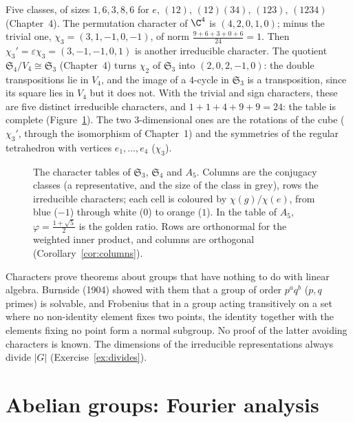 \begin{example}[$\mathfrak S_4$]\label{ex:s4}
Five classes, of sizes $1,6,3,8,6$ for $e$, $(12)$, $(12)(34)$, $(123)$, $(1234)$ (Chapter~4). The permutation character of $\C^4$ is $(4,2,0,1,0)$; minus the trivial one, $\chi_3=(3,1,-1,0,-1)$, of norm $\frac{9+6+3+0+6}{24}=1$. Then $\chi_3'=\varepsilon\chi_3=(3,-1,-1,0,1)$ is another irreducible character. The quotient $\mathfrak S_4/V_4\cong\mathfrak S_3$ (Chapter~4) turns $\chi_2$ of $\mathfrak S_3$ into $(2,0,2,-1,0)$: the double transpositions lie in $V_4$, and the image of a $4$-cycle in $\mathfrak S_3$ is a transposition, since its square lies in $V_4$ but it does not. With the trivial and sign characters, these are five distinct irreducible characters, and $1+1+4+9+9=24$: the table is complete (Figure~\ref{fig:tables}). The two $3$-dimensional ones are the rotations of the cube ($\chi_3'$, through the isomorphism of Chapter~1) and the symmetries of the regular tetrahedron with vertices $e_1,\dots,e_4$ ($\chi_3$).
\end{example}

\begin{figure}[ht]
\centering
{}
\caption{The character tables of $\mathfrak S_3$, $\mathfrak S_4$ and $A_5$. Columns are the conjugacy classes (a representative, and the size of the class in grey), rows the irreducible characters; each cell is coloured by $\chi(g)/\chi(e)$, from blue ($-1$) through white ($0$) to orange ($1$). In the table of $A_5$, $\varphi=\frac{1+\sqrt5}2$ is the golden ratio. Rows are orthonormal for the weighted inner product, and columns are orthogonal (Corollary~\ref{cor:columns}).}
\label{fig:tables}
\end{figure}

\begin{remark}
Characters prove theorems about groups that have nothing to do with linear algebra. Burnside (1904) showed with them that a group of order $p^aq^b$ ($p,q$ primes) is solvable, and Frobenius that in a group acting transitively on a set where no non-identity element fixes two points, the identity together with the elements fixing no point form a normal subgroup. No proof of the latter avoiding characters is known. The dimensions of the irreducible representations always divide $|G|$ (Exercise~\ref{ex:divides}).
\end{remark}

\section{Abelian groups: Fourier analysis}\label{sec:fourierab}

